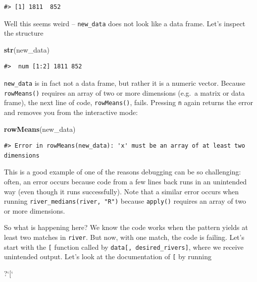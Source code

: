 \documentclass[
]{book}
\newenvironment{Shaded}{\begin{snugshade}}{\end{snugshade}}
\newcommand{\DataTypeTok}[1]{\textcolor[rgb]{0.13,0.29,0.53}{#1}}
\newcommand{\KeywordTok}[1]{\textcolor[rgb]{0.13,0.29,0.53}{\textbf{#1}}}
\newcommand{\NormalTok}[1]{#1}
\newcommand{\StringTok}[1]{\textcolor[rgb]{0.31,0.60,0.02}{#1}}
\begin{document}
\begin{verbatim}
#> [1] 1811  852
\end{verbatim}

Well this seems weird -- \texttt{new\_data} does not look like a data frame. Let's inspect the structure

\begin{Shaded}
\begin{Highlighting}[]
\KeywordTok{str}\NormalTok{(new_data)}
\end{Highlighting}
\end{Shaded}

\begin{verbatim}
#>  num [1:2] 1811 852
\end{verbatim}

\texttt{new\_data} is in fact not a data frame, but rather it is a numeric vector. Because \texttt{rowMeans()} requires an array of two or more dimensions (e.g.~a matrix or data frame), the next line of code, \texttt{rowMeans()}, fails. Pressing \texttt{n} again returns the error and removes you from the interactive mode:

\begin{Shaded}
\begin{Highlighting}[]
\KeywordTok{rowMeans}\NormalTok{(new_data)}
\end{Highlighting}
\end{Shaded}

\begin{verbatim}
#> Error in rowMeans(new_data): 'x' must be an array of at least two dimensions
\end{verbatim}

This is a good example of one of the reasons debugging can be so challenging: often, an error occurs because code from a few lines back runs in an unintended way (even though it runs successfully). Note that a similar error occurs when running \texttt{river\_medians(river,\ "R")} because \texttt{apply()} requires an array of two or more dimensions.

So what is happening here? We know the code works when the pattern yields at least two matches in \texttt{river}. But now, with one match, the code is failing. Let's start with the \texttt{{[}} function called by \texttt{data{[},\ desired\_rivers{]}}, where we receive unintended output. Let's look at the documentation of \texttt{{[}} by running

\begin{Shaded}
\begin{Highlighting}[]
\NormalTok{?}\StringTok{`}\DataTypeTok{[}\StringTok{`}
\end{Highlighting}
\end{Shaded}
\end{document}
